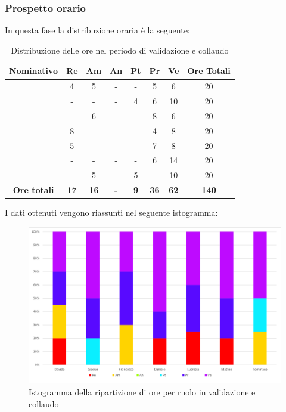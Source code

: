 \subsubsection{Prospetto orario}
In questa fase la distribuzione oraria è la seguente:
\begin{table}[H]
		\begin{center}
			\setlength{\aboverulesep}{0pt}
			\setlength{\belowrulesep}{0pt}
			\setlength{\extrarowheight}{.75ex}
			\begin{tabular}{ c c c c c c c c }
				\rowcolor{AzzurroGruppo!30} 
				\textbf{Nominativo} & \textbf{Re} & \textbf{Am} & \textbf{An} & \textbf{Pt} & \textbf{Pr} & \textbf{Ve} & \textbf{Ore Totali}  \\
				\toprule
				\Davide    & 4 & 5 & - & - & 5 & 6 & 20 \\
				\Giosue    & - & - & - & 4 & 6 & 10 & 20 \\
				\Francesco & - & 6 & - & - & 8 & 6 & 20\\
				\Daniele   & 8 & - & - & - & 4 & 8 & 20\\
				\Lucrezia  & 5 & - & - & - & 7 & 8 & 20\\
				\Matteo    & - & - & - & - & 6 & 14 & 20\\
				\Tommaso   & - & 5 & - & 5 & - & 10 & 20\\
				 \textbf{Ore totali} & \textbf{17} & \textbf{16} & \textbf{-} & \textbf{9} & \textbf{36} & \textbf{62} & \textbf{140} \\
				\bottomrule
			\end{tabular}
			\caption{Distribuzione delle ore nel periodo di validazione e collaudo}
		\end{center}
	\end{table}
	I dati ottenuti vengono riassunti nel seguente istogramma:
	\begin{figure}[H]
    \centering
    \includegraphics[scale = 0.5]{components/img/Sprint-10-11-isto.png}
    \caption{Istogramma della ripartizione di ore per ruolo in validazione e collaudo}
    \label{fig:Istogramma ripartizione ore , fase di validazione e collaudo}
\end{figure}

